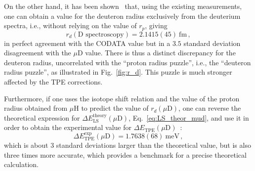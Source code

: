 \documentclass[prl,
twocolumn,
showpacs,preprintnumbers,amsmath,amssymb,
superscriptaddress,
a4paper,nofootinbib,longbibliography]{revtex4-2}
\begin{document}
On the other hand, it has been shown~\cite{Pohl1:2016xoo} that, using the existing measurements,
one can obtain a value for the deuteron radius exclusively from the deuterium spectra, i.e., without relying on the value of $r_p$,
giving
\begin{equation}
r_d(\text{D spectroscopy}) = 2.1415(45)\ \text{fm}\,,
\end{equation}
in perfect agreement with the CODATA value but in a $3.5$ standard deviation disagreement with the $\mu\text{D}$ value. There is thus
a distinct discrepancy for the deuteron radius, uncorrelated with the ``proton radius puzzle'', i.e., the ``deuteron radius puzzle'',
as illustrated in Fig.~\ref{fig:r_d}.
This puzzle is much stronger affected by the TPE corrections.

Furthermore, if one uses the isotope shift relation and the value of the proton radius obtained from $\mu$H
to predict the value of $r_d(\mu\text{D})$, one can reverse the theoretical expression for $\Delta E^\text{theory}_\text{LS}(\mu\text{D})$,
Eq.~\eqref{eq:LS_theor_mud},
and use it in order to obtain the experimental value for $\Delta E_\text{TPE}(\mu\text{D})$~\cite{Pohl1:2016xoo}:
\begin{equation}
\Delta E_\text{TPE}^\text{exp}(\mu\text{D})=1.7638(68)\ \text{meV}\,,
\end{equation}
which is about 3 standard deviations larger than the theoretical value, but is also three times more accurate, which provides
a benchmark for a precise theoretical calculation.
\end{document}

